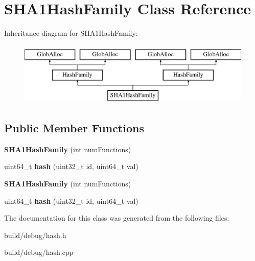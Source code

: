 \hypertarget{classSHA1HashFamily}{\section{S\-H\-A1\-Hash\-Family Class Reference}
\label{classSHA1HashFamily}
}
Inheritance diagram for S\-H\-A1\-Hash\-Family\-:\begin{figure}[H]
\begin{center}
\leavevmode
\includegraphics[height=3.000000cm]{classSHA1HashFamily}
\end{center}
\end{figure}
\subsection*{Public Member Functions}
\begin{DoxyCompactItemize}
\item 
\hypertarget{classSHA1HashFamily_ad259b15e686a9156e67d32aee169f4a7}{{\bfseries S\-H\-A1\-Hash\-Family} (int num\-Functions)}\label{classSHA1HashFamily_ad259b15e686a9156e67d32aee169f4a7}

\item 
\hypertarget{classSHA1HashFamily_abc713a520d1f69cef6f50f51b962c652}{uint64\-\_\-t {\bfseries hash} (uint32\-\_\-t id, uint64\-\_\-t val)}\label{classSHA1HashFamily_abc713a520d1f69cef6f50f51b962c652}

\item 
\hypertarget{classSHA1HashFamily_ad259b15e686a9156e67d32aee169f4a7}{{\bfseries S\-H\-A1\-Hash\-Family} (int num\-Functions)}\label{classSHA1HashFamily_ad259b15e686a9156e67d32aee169f4a7}

\item 
\hypertarget{classSHA1HashFamily_abc713a520d1f69cef6f50f51b962c652}{uint64\-\_\-t {\bfseries hash} (uint32\-\_\-t id, uint64\-\_\-t val)}\label{classSHA1HashFamily_abc713a520d1f69cef6f50f51b962c652}

\end{DoxyCompactItemize}


The documentation for this class was generated from the following files\-:\begin{DoxyCompactItemize}
\item 
build/debug/hash.\-h\item 
build/debug/hash.\-cpp\end{DoxyCompactItemize}
